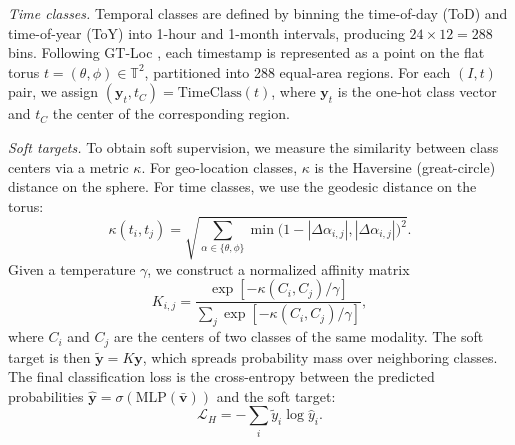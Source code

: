 \textit{Time classes.}  
Temporal classes are defined by binning the time-of-day (ToD) and time-of-year (ToY) into 1-hour and 1-month intervals, producing $24\times12=288$ bins. Following GT-Loc \cite{Shatwell_2025_ICCV}, each timestamp is represented as a point on the flat torus $t=(\theta,\phi)\in\mathbb{T}^2$, partitioned into 288 equal-area regions. For each $(I,t)$ pair, we assign $(\mathbf{y}_t,t_C)=\mathrm{TimeClass}(t)$, where $\mathbf{y}_t$ is the one-hot class vector and $t_C$ the center of the corresponding region.

\textit{Soft targets.}  
To obtain soft supervision, we measure the similarity between class centers via a metric $\kappa$. For geo-location classes, $\kappa$ is the Haversine (great-circle) distance on the sphere. For time classes, we use the geodesic distance on the torus:
\begin{equation}
    \kappa(t_i,t_j)=\sqrt{\sum_{\alpha\in\{\theta,\phi\}}
    \min\!\big(1-|\Delta\alpha_{i,j}|,|\Delta\alpha_{i,j}|\big)^2 }.
\end{equation}
Given a temperature $\gamma$, we construct a normalized affinity matrix
\begin{equation}
    K_{i,j}=\frac{\exp[-\kappa(C_i,C_j)/\gamma]}
    {\sum_j\exp[-\kappa(C_i,C_j)/\gamma]},
\end{equation}
where $C_i$ and $C_j$ are the centers of two classes of the same modality.  
The soft target is then $\widetilde{\mathbf{y}}=K\mathbf{y}$, which spreads probability mass over neighboring classes. The final classification loss is the cross-entropy between the predicted probabilities
$\hat{\mathbf{y}}=\sigma(\mathrm{MLP}(\bar{\mathbf{v}}))$
and the soft target:
\begin{equation}
    \mathcal{L}_H=-\sum_i \widetilde{y}_i\log\hat{y}_i.
\end{equation}

